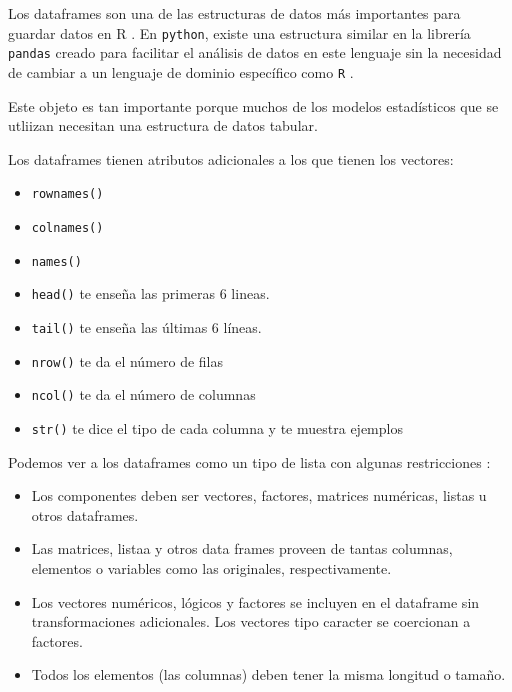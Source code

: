 \documentclass[]{article}
\providecommand{\tightlist}{%
  \setlength{\itemsep}{0pt}\setlength{\parskip}{0pt}}
\begin{document}
Los dataframes son una de las estructuras de datos más importantes para
guardar datos en R
\parencite[][sección ``Data frames'']{wickham2014advanced}. En
\texttt{python}, existe una estructura similar en la librería
\texttt{pandas} creado para facilitar el análisis de datos en este
lenguaje sin la necesidad de cambiar a un lenguaje de dominio específico
como \texttt{R}
\parencite[][sección ``What problem does pandas solve?'']{pandas}.

Este objeto es tan importante porque muchos de los modelos estadísticos
que se utliizan necesitan una estructura de datos tabular.

Los dataframes tienen atributos adicionales a los que tienen los
vectores:

\begin{itemize}
\tightlist
\item
  \texttt{rownames()}
\item
  \texttt{colnames()}
\item
  \texttt{names()}
\item
  \texttt{head()} te enseña las primeras 6 lineas.
\item
  \texttt{tail()} te enseña las últimas 6 líneas.
\item
  \texttt{nrow()} te da el número de filas
\item
  \texttt{ncol()} te da el número de columnas
\item
  \texttt{str()} te dice el tipo de cada columna y te muestra ejemplos
\end{itemize}

Podemos ver a los dataframes como un tipo de lista con algunas
restricciones \parencite[][sección ``Data frames'']{rmanual}:

\begin{itemize}
\tightlist
\item
  Los componentes deben ser vectores, factores, matrices numéricas,
  listas u otros dataframes.
\item
  Las matrices, listaa y otros data frames proveen de tantas columnas,
  elementos o variables como las originales, respectivamente.
\item
  Los vectores numéricos, lógicos y factores se incluyen en el dataframe
  sin transformaciones adicionales. Los vectores tipo caracter se
  coercionan a factores.
\item
  Todos los elementos (las columnas) deben tener la misma longitud o
  tamaño.
\end{itemize}
\end{document}
